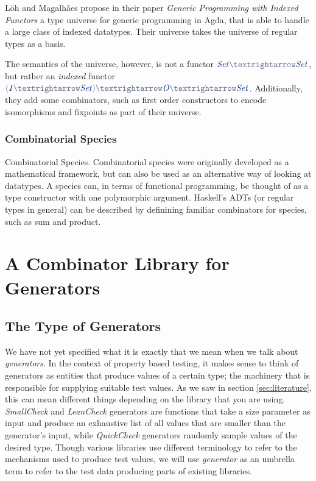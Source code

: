 \documentclass[a4paper,msc,twosized=semi]{uustthesis}
\newcommand*{\mathcolor}{}
\def\mathcolor#1#{\mathcoloraux{#1}}
\newcommand*{\mathcoloraux}[3]{%
  \protect\leavevmode
  \begingroup
    \color#1{#2}#3%
  \endgroup
}
\newcommand{\HSSpecial}[1]{\mathcolor{hsblue4}{#1}}
\newcommand{\HSSym}[1]{\mathcolor{hsblue4}{#1}}
\newcommand{\HSCon}[1]{\mathcolor{hsblue3}{\mathit{#1}}}
\begin{document}
  Löh and Magalhães propose in their paper \emph{Generic Programming with Indexed 
  Functors} \cite{loh2011generic} a type universe for generic programming in Agda, 
  that is able to handle a large class of indexed datatypes. Their universe takes the 
  universe of regular types as a basis. 
  
  The semantics of the universe, however, is not a functor \ensuremath{\HSCon{Set}\HSSym{→}\HSCon{Set}}, but rather an 
  \emph{indexed} functor \ensuremath{\HSSpecial{(}\HSCon{I}\HSSym{→}\HSCon{Set}\HSSpecial{)}\HSSym{→}\HSCon{O}\HSSym{→}\HSCon{Set}}. Additionally, they add some 
  combinators, such as first order constructors to encode isomorphisms and fixpoints 
  as part of their universe. 

\subsection{Combinatorial Species}

  Combinatorial Species. Combinatorial species \cite{yorgey2010species} were 
  originally developed as a mathematical framework, but can also be used as an 
  alternative way of looking at datatypes. A species can, in terms of functional 
  programming, be thought of as a type constructor with one polymorphic argument. 
  Haskell’s ADTs (or regular types in general) can be described by definining familiar 
  combinators for species, such as sum and product.

\chapter{A Combinator Library for Generators}
\section{The Type of Generators}

  We have not yet specified what it is exactly that we mean when we talk about \textit{generators}. In the context of property based testing, it makes sense to think of generators as entities that produce values of a certain type; the machinery that is responsible for supplying suitable test values. As we saw in section \cref{sec:literature}, this can mean different things depending on the library that you are using. \textit{SmallCheck} and \textit{LeanCheck} generators are functions that take a size parameter as input and produce an exhaustive list of all values that are smaller than the generator's input, while \textit{QuickCheck} generators randomly sample values of the desired type. Though various libraries use different terminology to refer to the mechanisms used to produce test values, we will use \textit{generator} as an umbrella term to refer to the test data producing parts of existing libraries. 
\end{document}
